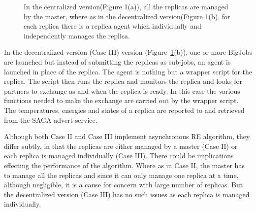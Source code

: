 \documentclass[a4paper,10pt]{article}
\newcommand{\jhanote}[1]{ {\textcolor{red} { ***shantenu: #1 }}}
\newcommand{\jhanote}[1]{}
\begin{document}
\begin{figure}
\centering
{}
\caption{\small In the centralized version(Figure 1(a)), all the replicas are managed by the master, where as in the decentralized version(Figure 1(b), for each replica there is a replica agent which individually and independently manages the replica.}
\label{fig:async}
\end{figure}
 

In the decentralized version (Case III) version
(Figure~\ref{fig:async}(b)), one or more BigJobs are launched
but instead of submitting the replicas as sub-jobs, an agent is
launched in place of the replica. The agent is nothing but a wrapper
script for the replica. The script then runs the replica and monitors
the replica and looks for partners to exchange as and when the replica
is ready. In this case the various functions needed to make the
exchange are carried out by the wrapper script. The temperatures,
energies and states of a replica are reported to and retrieved from
the SAGA advert service. 

Although both Case II and Case III implement asynchronous 
RE algorithm, they differ subtly, in that the replicas
are either managed by a master (Case II) or each replica
is managed individually (Case III).
There could be implications effecting the performance of the
algorithm. Where as in Case II, the master has to manage all the
replicas and since it can only manage one replica at a time, although negligible, it is a cause for concern with large number of replicas. %
But the decentralized version (Case III) has no
such issues as each replica is managed individually. %
\end{document}
